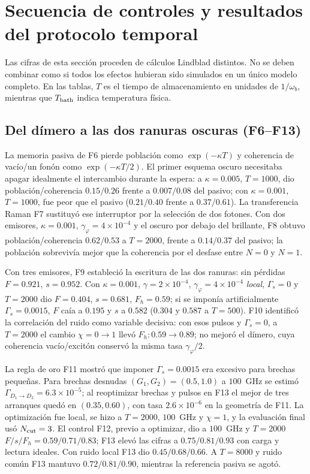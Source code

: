 \documentclass[11pt,a4paper]{article}
\newcommand{\wb}{\omega_b}
\newcommand{\gphi}{\gamma_\varphi}
\begin{document}
\section{Secuencia de controles y resultados del protocolo temporal}\label{sec:series}
Las cifras de esta sección proceden de cálculos Lindblad distintos. No se deben combinar como si
todos los efectos hubieran sido simulados en un único modelo completo. En las tablas,
$T$ es el tiempo de almacenamiento en unidades de $1/\wb$, mientras que $T_{\rm bath}$
indica temperatura física.

\subsection{Del dímero a las dos ranuras oscuras (F6--F13)}
La memoria pasiva de F6 pierde población como $\exp(-\kappa T)$ y coherencia de
vacío/un fonón como $\exp(-\kappa T/2)$. El primer esquema oscuro necesitaba apagar
idealmente el intercambio durante la espera: a $\kappa=0.005$, $T=1000$, dio
población/coherencia $0.15/0.26$ frente a $0.007/0.08$ del pasivo; con
$\kappa=0.001$, $T=1000$, fue peor que el pasivo ($0.21/0.40$ frente a $0.37/0.61$).
La transferencia Raman F7 sustituyó ese interruptor por la selección de dos fotones.
Con dos emisores, $\kappa=0.001$, $\gphi=4\times10^{-4}$ y el oscuro por debajo del brillante,
F8 obtuvo población/coherencia $0.62/0.53$ a $T=2000$, frente a $0.14/0.37$ del pasivo;
la población sobrevivía mejor que la coherencia por el desfase entre $N=0$ y $N=1$.

Con tres emisores, F9 estableció la escritura de las dos ranuras: sin pérdidas
$F=0.921$, $s=0.952$. Con $\kappa=0.001$, $\gamma=2\times10^{-4}$,
$\gphi=4\times10^{-4}$ \emph{local}, $\Gamma_s=0$ y $T=2000$ dio
$F=0.404$, $s=0.681$, $F_h=0.59$; si se imponía artificialmente
$\Gamma_s=0.0015$, $F$ caía a $0.195$ y $s$ a $0.582$ ($0.304$ y $0.587$ a $T=500$).
F10 identificó la correlación del ruido como variable decisiva: con esos pulsos
y $\Gamma_s=0$, a $T=2000$ el cambio $\chi=0\to1$ llevó
$F_h:0.59\to0.89$; no mejoró el dímero, cuya coherencia vacío/excitón
conservó la misma tasa $\gphi/2$.

La regla de oro F11 mostró que imponer $\Gamma_s=0.0015$ era excesivo para brechas
pequeñas. Para brechas desnudas $(G_1,G_2)=(0.5,1.0)$ a $100$~GHz se estimó
$\Gamma_{D_1\to D_2}=6.3\times10^{-5}$; al reoptimizar brechas y pulsos en F13
el mejor de tres arranques quedó en $(0.35,0.60)$, con tasa
$2.6\times10^{-6}$ en la geometría de F11. La optimización fue local,
se hizo a $T=2000$, $100$~GHz y $\chi=1$, y la evaluación final usó
$N_{\rm cut}=3$. El control F12, previo a optimizar, dio a $100$~GHz
y $T=2000$ $F/s/F_h=0.59/0.71/0.83$; F13 elevó las cifras a
$0.75/0.81/0.93$ con carga y lectura ideales. Con ruido local F13 dio
$0.45/0.68/0.66$. A $T=8000$ y ruido común F13 mantuvo
$0.72/0.81/0.90$, mientras la referencia pasiva se agotó.
\end{document}
